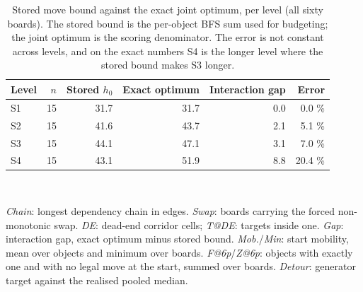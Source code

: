 
\begin{table}[tbp]
  \centering
  \footnotesize
  \caption{Stored move bound against the exact joint optimum, per level (all sixty boards). The stored bound is the per-object BFS sum used for budgeting; the joint optimum is the scoring denominator. The error is not constant across levels, and on the exact numbers S4 is the longer level where the stored bound makes S3 longer.}
  \label{tab:denominator}
  \begin{tabular}{lrrrrr}
    \toprule
    Level & $n$ & Stored $h_0$ & Exact optimum & Interaction gap & Error \\
    \midrule
    S1 & 15 & 31.7 & 31.7 & 0.0 & 0.0 \% \\
    S2 & 15 & 41.6 & 43.7 & 2.1 & 5.1 \% \\
    S3 & 15 & 44.1 & 47.1 & 3.1 & 7.0 \% \\
    S4 & 15 & 43.1 & 51.9 & 8.8 & 20.4 \% \\
    \bottomrule
  \end{tabular}
\end{table}

\begin{table}[tbp]
  \centering
  \footnotesize
  \caption{Per-board property audit, summarised by level (all sixty boards; means unless stated). Every column is a function of the instance file alone --- no model, no episode. Per-board rows are in Appendix~C.}
  \label{tab:audit}
  \\[2pt]
  \begin{minipage}{0.9\textwidth}\footnotesize
  \emph{Chain}: longest dependency chain in edges. \emph{Swap}: boards carrying the forced non-monotonic swap. \emph{DE}: dead-end corridor cells; \emph{T@DE}: targets inside one. \emph{Gap}: interaction gap, exact optimum minus stored bound. \emph{Mob.}/\emph{Min}: start mobility, mean over objects and minimum over boards. \emph{F@6p}/\emph{Z@6p}: objects with exactly one and with no legal move at the start, summed over boards. \emph{Detour}: generator target against the realised pooled median.
  \end{minipage}
\end{table}

